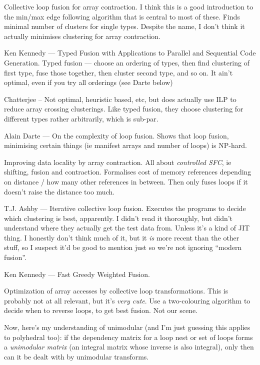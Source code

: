 \cite{gao1993collective} Collective loop fusion for array contraction.
I think this is a good introduction to the min/max edge following algorithm that is central to most of these.
Finds minimal number of clusters for single types. Despite the name, I don't think it actually minimises clustering for array contraction.

\cite{kennedy1993typedfusion} Ken Kennedy --- Typed Fusion with Applications to Parallel and Sequential Code Generation.
Typed fusion --- choose an ordering of types, then find clustering of first type, fuse those together, then cluster second type, and so on.
It ain't optimal, even if you try all orderings (see Darte below)

\cite{chatterjee1991size} Chatterjee -- Not optimal, heuristic based, etc, but does actually use ILP to reduce array crossing clusterings. Like typed fusion, they choose clustering for different types rather arbitrarily, which is sub-par.

\cite{darte1999complexity} Alain Darte --- On the complexity of loop fusion.
Shows that loop fusion, minimising certain things (ie manifest arrays and number of loops) is NP-hard.

\cite{song2004improving} Improving data locality by array contraction.
All about \emph{controlled SFC}, ie shifting, fusion and contraction.
Formalises cost of memory references depending on distance / how many other references in between. Then only fuses loops if it doesn't raise the distance too much.

\cite{ashby2006iterative} T.J. Ashby --- Iterative collective loop fusion.
Executes the programs to decide which clustering is best, apparently. I didn't read it thoroughly, but didn't understand where they actually get the test data from. Unless it's a kind of JIT thing.
I honestly don't think much of it, but it \emph{is} more recent than the other stuff, so I suspect it'd be good to mention just so we're not ignoring ``modern fusion''.

\cite{kennedy2001fastgreedy} Ken Kennedy --- Fast Greedy Weighted Fusion.

\cite{sarkar1991optimization} Optimization of array accesses by collective loop transformations. This is probably not at all relevant, but it's \emph{very cute}. Use a two-colouring algorithm to decide when to reverse loops, to get best fusion. Not our scene.


Now, here's my understanding of unimodular (and I'm just guessing this applies to polyhedral too):
if the dependency matrix for a loop nest or set of loops forms a \emph{unimodular matrix} (an integral matrix whose inverse is also integral), only then can it be dealt with by unimodular transforms.
